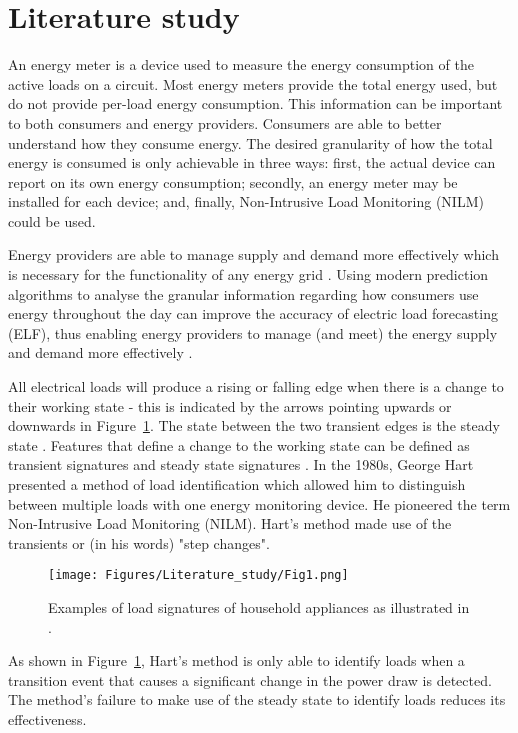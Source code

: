 
\section{Literature study}
An energy meter is a device used to measure the energy consumption of the active loads on a circuit. Most energy meters provide the total energy used, but do not provide per-load energy consumption. This information can be important to both consumers and energy providers.
 Consumers are able to better understand how they consume energy. The desired granularity of how the total energy is consumed is only achievable in three ways: first, the actual device can report on its own energy consumption; secondly, an energy meter may be installed for each device; and, finally, Non-Intrusive Load Monitoring (NILM) could be used.
\par
Energy providers are able to manage supply and demand more effectively which is necessary for the functionality of any energy grid \cite{Grid_predic}. Using modern prediction algorithms to analyse the granular information regarding how consumers use energy throughout the day can improve the accuracy of electric load forecasting (ELF), thus enabling energy providers to manage (and meet) the energy supply and demand more effectively \cite{7926112}.
\par
All electrical loads will produce a rising or falling edge when there is a change to their working state - this is indicated by the arrows pointing upwards or downwards in Figure~\ref{fig:1}. The state between the two transient edges is the steady state \cite{RN38}. Features that define a change to the working state can be defined as transient signatures and steady state signatures \cite{RN34}. In the 1980s, George Hart \cite{RN42} presented a method of load identification which allowed him to distinguish between multiple loads with one energy monitoring device. He pioneered the term Non-Intrusive Load Monitoring (NILM). Hart's method made use of the transients or (in his words) "step changes". 
\begin{figure}[H]
    \centering
    \texttt{[image: Figures/Literature\_study/Fig1.png]}
    \caption{Examples of load signatures of household appliances as illustrated in \cite{RN42}.}
    \label{fig:1}
\end{figure}
As shown in Figure~\ref{fig:1}, Hart's method is only able to identify loads when a transition event that causes a significant change in the power draw is detected. The method's failure to make use of the steady state to identify loads reduces its effectiveness.
